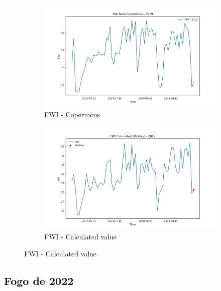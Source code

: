 \begin{figure}[h]
	\caption{Comparison of FWI calculated values and Copernicus at midday - 2019}
	\centering
	\begin{subfigure}{0.49\textwidth}
		\centering
		\includegraphics[width=\textwidth]{graphs/2019/2019CopernicusFWI12.png}
		\caption{FWI - Copernicus}
		\label{fig:fwi_copernicus_2019_midday}
	\end{subfigure}
	\hfill
	\begin{subfigure}{0.49\textwidth}
		\centering
		\includegraphics[width=\textwidth]{graphs/2019/2019CalcFWI12.png}
		\caption{FWI - Calculated value}
		\label{fig:fwi_calculated_2019_midday}
	\end{subfigure}
	\label{fig:comparison_fwi_2019_midday_copernicus_calculated}
\end{figure}


\FloatBarrier

\subsection{Fogo de 2022}

